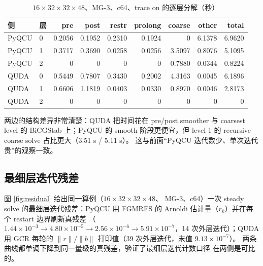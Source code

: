 \documentclass[UTF8,a4paper,11pt]{ctexart}
\begin{document}
\begin{table}[htbp]
\centering
\small
\caption{$16\times32\times32\times48$、MG-3、c64、trace on 的逐层分解（秒）}
\begin{tabularx}{\textwidth}{@{}L{0.10\textwidth}L{0.08\textwidth}rrrrrrr@{}}
\toprule
侧 & 层 & pre & post & restr & prolong & coarse & other & total \\
\midrule
PyQCU & 0 & 0.2056 & 0.1952 & 0.2310 & 0.1924 & 0 & 6.1378 & 6.9620 \\
PyQCU & 1 & 0.3717 & 0.3690 & 0.0258 & 0.0256 & 3.5097 & 0.8076 & 5.1095 \\
PyQCU & 2 & 0 & 0 & 0 & 0 & 0.7880 & 0.0344 & 0.8224 \\
QUDA & 0 & 0.5449 & 0.7807 & 0.3430 & 0.2002 & 4.3163 & 0.0045 & 6.1896 \\
QUDA & 1 & 0.6606 & 1.1819 & 0.0403 & 0.0330 & 0.8970 & 0.0046 & 2.8173 \\
QUDA & 2 & 0 & 0 & 0 & 0 & 0 & 0 & 0 \\
\bottomrule
\end{tabularx}
\end{table}

两边的结构差异非常清楚：QUDA 把时间花在 pre/post smoother 与
coarsest level 的 BiCGStab 上；PyQCU 的 smooth 阶段更便宜，但
level 1 的 recursive coarse solve 占比更大（3.51 s / 5.11 s）。
这与前面“PyQCU 迭代数少、单次迭代贵”的观察一致。

\subsection{最细层迭代残差}

图 \ref{fig:residual} 给出同一算例（$16\times32\times32\times48$、
MG-3、c64）一次 steady solve 的最细层迭代残差：PyQCU 用
FGMRES 的 Arnoldi 估计量（$r_k$）并在每个 restart 边界刷新真残差
（$1.44\times10^{-3}\to4.80\times10^{-5}\to2.56\times10^{-6}
\to5.91\times10^{-7}$，14 次外层迭代）；QUDA 用 GCR 每轮的
$\|r\|/\|b\|$ 打印值（39 次外层迭代，末值 $9.13\times10^{-7}$）。
两条曲线都单调下降到同一量级的真残差，验证了最细层迭代计数口径
在两侧是可比的。
\end{document}
